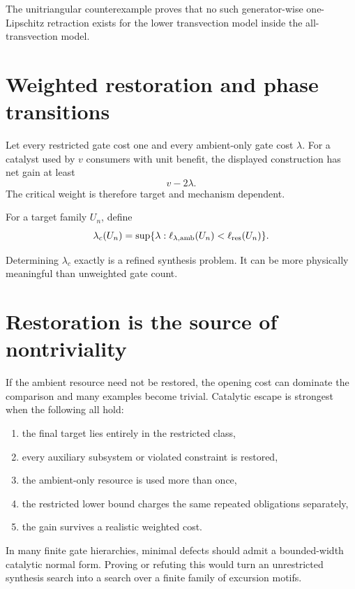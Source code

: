 The unitriangular counterexample proves that no such generator-wise one-Lipschitz retraction exists for the lower transvection model inside the all-transvection model.

\section{Weighted restoration and phase transitions}
Let every restricted gate cost one and every ambient-only gate cost $\lambda$.  For a catalyst used by $v$ consumers with unit benefit, the displayed construction has net gain at least
\[
v-2\lambda.
\]
The critical weight is therefore target and mechanism dependent.

\begin{definition}
For a target family $U_n$, define
\[
\lambda_c(U_n)
=
\sup\{\lambda:\ell_{\lambda,\mathrm{amb}}(U_n)<\ell_{\mathrm{res}}(U_n)\}.
\]
\end{definition}
Determining $\lambda_c$ exactly is a refined synthesis problem.  It can be more physically meaningful than unweighted gate count.

\section{Restoration is the source of nontriviality}
If the ambient resource need not be restored, the opening cost can dominate the comparison and many examples become trivial.  Catalytic escape is strongest when the following all hold:
\begin{enumerate}
\item the final target lies entirely in the restricted class,
\item every auxiliary subsystem or violated constraint is restored,
\item the ambient-only resource is used more than once,
\item the restricted lower bound charges the same repeated obligations separately,
\item the gain survives a realistic weighted cost.
\end{enumerate}

\begin{conjecturebox}
In many finite gate hierarchies, minimal defects should admit a bounded-width catalytic normal form.  Proving or refuting this would turn an unrestricted synthesis search into a search over a finite family of excursion motifs.
\end{conjecturebox}
